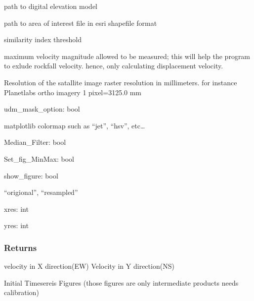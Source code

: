 \documentclass[letterpaper,10pt]{sphinxmanual}
\begin{document}
\begin{fulllineitems}
\begin{description}
\sphinxAtStartPar
path to digital elevation model

\sphinxAtStartPar
path to area of interest file in esri shapefile format

\sphinxAtStartPar
similarity index threshold

\sphinxAtStartPar
maximum velocity magnitude allowed to be measured; this will help the program to exlude rockfall velocity.
hence, only calculating displacement velocity.

\sphinxAtStartPar
Resolution of the satallite image raster resolution in millimeters. 
for instance Planetlabs ortho imagery 1 pixel=3125.0 mm

\end{description}

\sphinxAtStartPar
udm\_mask\_option: bool
\begin{description}
\sphinxAtStartPar
matplotlib colormap such as “jet”, “hsv”, etc…

\end{description}

\sphinxAtStartPar
Median\_Filter: bool

\sphinxAtStartPar
Set\_fig\_MinMax: bool

\sphinxAtStartPar
show\_figure: bool
\begin{description}
\sphinxAtStartPar
“origional”,  “resampled”

\end{description}

\sphinxAtStartPar
xres: int

\sphinxAtStartPar
yres: int


\subsubsection{Returns}
\label{\detokenize{generated/akhdefo_functions.DynamicChangeDetection:returns}}\begin{description}
\sphinxAtStartPar
velocity in X direction(EW)
Velocity in Y direction(NS)

\sphinxAtStartPar
Initial Timesereis Figures (those figures are only intermediate products needs calibration)

\end{description}

\end{fulllineitems}
\end{document}
